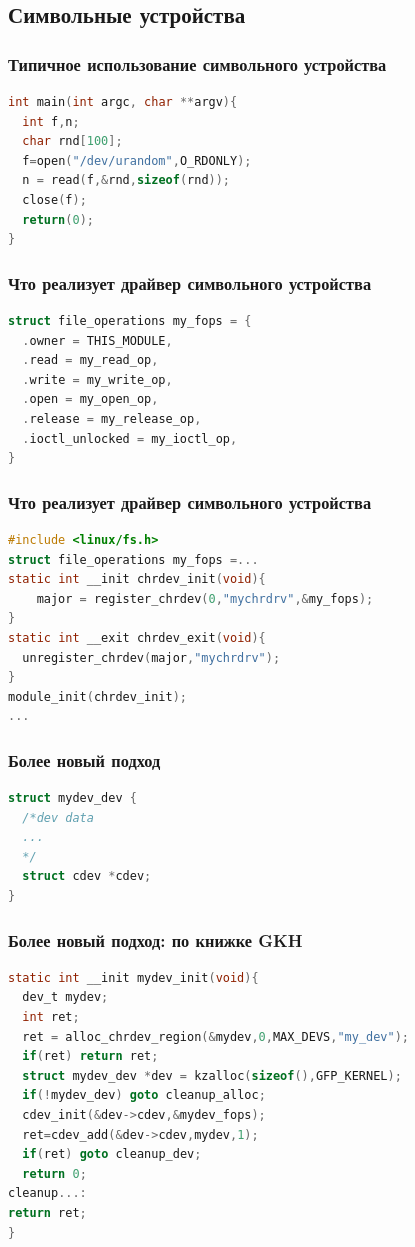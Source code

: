 \subsection{Символьные устройства}
\begin{frame}[fragile]
  \frametitle{Типичное использование символьного устройства}
\begin{lstlisting}[language=C]
int main(int argc, char **argv){
  int f,n;
  char rnd[100];
  f=open("/dev/urandom",O_RDONLY);
  n = read(f,&rnd,sizeof(rnd));
  close(f);
  return(0);
}
\end{lstlisting}
\end{frame}
\begin{frame}[fragile]
  \frametitle{Что реализует драйвер символьного устройства}
\begin{lstlisting}[language=C]
struct file_operations my_fops = {
  .owner = THIS_MODULE,
  .read = my_read_op,
  .write = my_write_op,
  .open = my_open_op,
  .release = my_release_op,
  .ioctl_unlocked = my_ioctl_op,
}
\end{lstlisting}
\end{frame}
\begin{frame}[fragile]
  \frametitle{Что реализует драйвер символьного устройства}
\begin{lstlisting}[language=C]
#include <linux/fs.h>
struct file_operations my_fops =...
static int __init chrdev_init(void){
    major = register_chrdev(0,"mychrdrv",&my_fops);
}
static int __exit chrdev_exit(void){
  unregister_chrdev(major,"mychrdrv");
}
module_init(chrdev_init);
...
\end{lstlisting}
\end{frame}

\begin{frame}[fragile]
  \frametitle{Более новый подход}
\begin{lstlisting}[language=C]
struct mydev_dev {
  /*dev data
  ...
  */
  struct cdev *cdev;
}
\end{lstlisting}
\end{frame}

\begin{frame}[fragile]
  \frametitle{Более новый подход: по книжке GKH}
\begin{lstlisting}[language=C]
static int __init mydev_init(void){
  dev_t mydev;
  int ret;
  ret = alloc_chrdev_region(&mydev,0,MAX_DEVS,"my_dev");
  if(ret) return ret;
  struct mydev_dev *dev = kzalloc(sizeof(),GFP_KERNEL);
  if(!mydev_dev) goto cleanup_alloc;
  cdev_init(&dev->cdev,&mydev_fops);
  ret=cdev_add(&dev->cdev,mydev,1);
  if(ret) goto cleanup_dev;
  return 0;
cleanup...:
return ret;
}
\end{lstlisting}
\end{frame}

